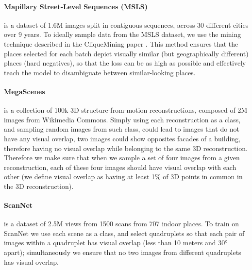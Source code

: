 \paragraph{Mapillary Street-Level Sequences (MSLS)}
is a dataset of 1.6M images split in contiguous sequences, across 30 different cities over 9 years.
To ideally sample data from the MSLS dataset, we use the mining technique described in the CliqueMining paper \cite{Izquierdo_2024_cliqueM}.
This method ensures that the places selected for each batch depict visually similar (but geographically different) places (\ie hard negatives), so that the loss can be as high as possible and effectively teach the model to disambiguate between similar-looking places.

\paragraph{MegaScenes}
is a collection of 100k 3D structure-from-motion reconstructions, composed of 2M images from Wikimedia Commons.
Simply using each reconstruction as a class, and sampling random images from such class, could lead to images that do not have any visual overlap, \eg two images could show opposites facades of a building, therefore having no visual overlap while belonging to the same 3D reconstruction.
Therefore we make sure that when we sample a set of four images from a given reconstruction, each of these four images should have visual overlap with each other (we define visual overlap as having at least 1\% of 3D points in common in the 3D reconstruction).

\paragraph{ScanNet}
is a dataset of 2.5M views from 1500 scans from 707 indoor places.
To train on ScanNet we use each scene as a class, and select quadruplets so that each pair of images within a quadruplet has visual overlap (\ie less than 10 meters and 30° apart);
simultaneously we ensure that no two images from different quadruplets has visual overlap.

